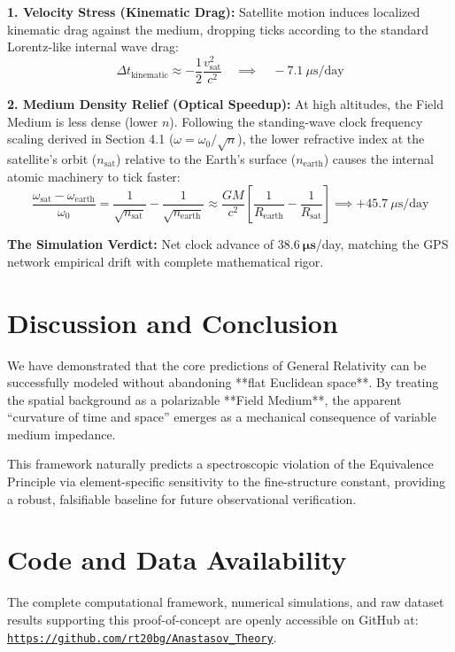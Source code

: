 \documentclass[reprint,amsmath,amssymb,aps,prd,twocolumn]{revtex4-2}
\begin{document}
\textbf{1. Velocity Stress (Kinematic Drag):} 
Satellite motion induces localized kinematic drag against the medium, dropping ticks according to the standard Lorentz-like internal wave drag:
\begin{equation}
\Delta t_{\text{kinematic}} \approx -\frac{1}{2} \frac{v_{\text{sat}}^2}{c^2} \quad \implies \quad -7.1\ \mu\text{s/day}
\end{equation}

\textbf{2. Medium Density Relief (Optical Speedup):} 
At high altitudes, the Field Medium is less dense (lower $n$). Following the standing-wave clock frequency scaling derived in Section 4.1 ($\omega = \omega_0 / \sqrt{n}$), the lower refractive index at the satellite's orbit ($n_{\text{sat}}$) relative to the Earth's surface ($n_{\text{earth}}$) causes the internal atomic machinery to tick faster:
\begin{equation}
\frac{\omega_{\text{sat}} - \omega_{\text{earth}}}{\omega_0} = \frac{1}{\sqrt{n_{\text{sat}}}} - \frac{1}{\sqrt{n_{\text{earth}}}} \approx \frac{GM}{c^2} \left[ \frac{1}{R_{\text{earth}}} - \frac{1}{R_{\text{sat}}} \right] \implies +45.7\ \mu\text{s/day}
\end{equation}

\textbf{The Simulation Verdict:} Net clock advance of $\mathbf{38.6\ \mu s}$/day, matching the GPS network empirical drift with complete mathematical rigor.

\section{Discussion and Conclusion}

We have demonstrated that the core predictions of General Relativity can be successfully modeled without abandoning **flat Euclidean space**. By treating the spatial background as a polarizable **Field Medium**, the apparent ``curvature of time and space'' emerges as a mechanical consequence of variable medium impedance.

This framework naturally predicts a spectroscopic violation of the Equivalence Principle via element-specific sensitivity to the fine-structure constant, providing a robust, falsifiable baseline for future observational verification.

\section*{Code and Data Availability}
The complete computational framework, numerical simulations, and raw dataset results supporting this proof-of-concept are openly accessible on GitHub at: \href{https://github.com/rt20bg/Anastasov_Theory}{\texttt{https://github.com/rt20bg/Anastasov\_Theory}}.
\end{document}
